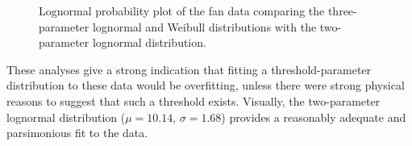 \begin{example}
\begin{figure}
\caption{Lognormal probability plot of the fan data comparing
the three-parameter lognormal and Weibull distributions with the
two-parameter lognormal distribution.}
\label{figure:fan.getsnormal.gmleprobplot.ps}
\end{figure}
 
These analyses give a strong indication that fitting a
threshold-parameter distribution to these data would be overfitting,
unless there were strong physical reasons to suggest that such a
threshold exists. Visually, the two-parameter lognormal distribution
($\mu=10.14$, $\sigma=1.68$) provides a reasonably adequate and
parsimonious fit to the data.
\end{example}



